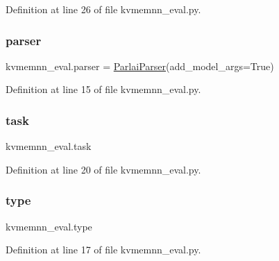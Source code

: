 Definition at line 26 of file kvmemnn\+\_\+eval.\+py.

\mbox{\label{namespacekvmemnn__eval_af5fc7707b5c6eee8e4cd13b444afee22}} 
\subsubsection{\texorpdfstring{parser}{parser}}
{\footnotesize\ttfamily kvmemnn\+\_\+eval.\+parser = \hyperlink{classparlai_1_1core_1_1params_1_1ParlaiParser}{Parlai\+Parser}(add\+\_\+model\+\_\+args=True)}



Definition at line 15 of file kvmemnn\+\_\+eval.\+py.

\mbox{\label{namespacekvmemnn__eval_a6f65ac8e4e08e7bebc38275bdc0f8c09}} 
\subsubsection{\texorpdfstring{task}{task}}
{\footnotesize\ttfamily kvmemnn\+\_\+eval.\+task}



Definition at line 20 of file kvmemnn\+\_\+eval.\+py.

\mbox{\label{namespacekvmemnn__eval_a07ce55fd0997ccd4b5ff1cec6b2e254e}} 
\subsubsection{\texorpdfstring{type}{type}}
{\footnotesize\ttfamily kvmemnn\+\_\+eval.\+type}



Definition at line 17 of file kvmemnn\+\_\+eval.\+py.

